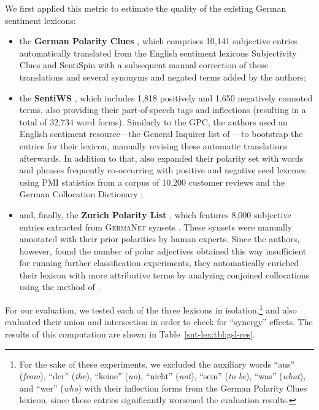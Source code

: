 We first applied this metric to estimate the quality of the existing
German sentiment lexicons:
\begin{itemize}
\item the \textbf{German Polarity Clues} \cite[GPC;][]{Waltinger:10},
  which comprises 10,141 subjective entries automatically translated
  from the English sentiment lexicons Subjectivity Clues
  \cite{Wilson:05} and SentiSpin \cite{Takamura:05} with a subsequent
  manual correction of these translations and several synonyms and
  negated terms added by the authors;

\item the \textbf{SentiWS} \cite[SWS;][]{Remus:10}, which includes
  1,818 positively and 1,650 negatively connoted terms, also providing
  their part-of-speech tags and inflections (resulting in a total of
  32,734 word forms).  Similarly to the GPC, the authors used an
  English sentiment resource---the General Inquirer list of
  \citet{Stone:66}---to bootstrap the entries for their lexicon,
  manually revising these automatic translations afterwards.  In
  addition to that, \citet{Remus:10} also expanded their polarity set
  with words and phrases frequently co-occurring with positive and
  negative seed lexemes using PMI statistics from a corpus of 10,200
  customer reviews and the German Collocation Dictionary
  \cite{Quasthoff:10};

\item and, finally, the \textbf{Zurich Polarity List}
  \cite[ZPL;][]{Clematide:10}, which features 8,000 subjective entries
  extracted from \textsc{GermaNet} synsets \cite{Hamp:97}.  These
  synsets were manually annotated with their prior polarities by human
  experts.  Since the authors, however, found the number of polar
  adjectives obtained this way insufficient for running further
  classification experiments, they automatically enriched their
  lexicon with more attributive terms by analyzing conjoined
  collocations using the method of \citet{Hatzivassi:97}.
\end{itemize}

For our evaluation, we tested each of the three lexicons in
isolation,\footnote{For the sake of these experiments, we excluded the
  auxiliary words ``aus'' (\emph{from}), ``der'' (\emph{the}),
  ``keine'' (\emph{no}), ``nicht'' (\emph{not}), ``sein'' (\emph{to
    be}), ``was'' (\emph{what}), and ``wer'' (\emph{who}) with their
  inflection forms from the German Polarity Clues lexicon, since these
  entries significantly worsened the evaluation results.} and also
evaluated their union and intersection in order to check for
``synergy'' effects.  The results of this computation are shown in
Table~\ref{snt-lex:tbl:gsl-res}.

